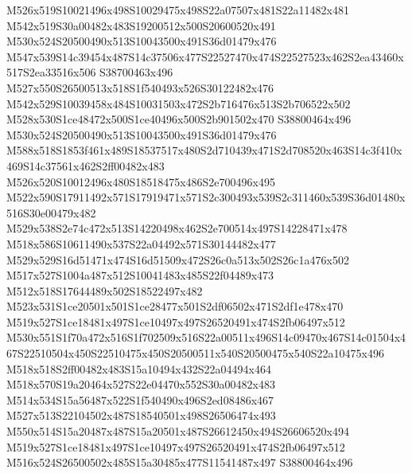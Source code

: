 \documentclass{article}
\begin{document}
\begin{multicols}{2}







M526x519S10021496x498S10029475x498S22a07507x481S22a11482x481 M542x519S30a00482x483S19200512x500S20600520x491 M530x524S20500490x513S10043500x491S36d01479x476 M547x539S14c39454x487S14c37506x477S22527470x474S22527523x462S2ea43460x517S2ea33516x506 S38700463x496 M527x550S26500513x518S1f540493x526S30122482x476 M542x529S10039458x484S10031503x472S2b716476x513S2b706522x502 M528x530S1ce48472x500S1ce40496x500S2b901502x470 S38800464x496 M530x524S20500490x513S10043500x491S36d01479x476 M588x518S1853f461x489S18537517x480S2d710439x471S2d708520x463S14c3f410x469S14c37561x462S2ff00482x483 M526x520S10012496x480S18518475x486S2e700496x495 M522x590S17911492x571S17919471x571S2c300493x539S2c311460x539S36d01480x516S30e00479x482 M529x538S2e74c472x513S14220498x462S2e700514x497S14228471x478 M518x586S10611490x537S22a04492x571S30144482x477 M529x529S16d51471x474S16d51509x472S26c0a513x502S26c1a476x502 M517x527S1004a487x512S10041483x485S22f04489x473 M512x518S17644489x502S18522497x482 M523x531S1ce20501x501S1ce28477x501S2df06502x471S2df1e478x470 M519x527S1ce18481x497S1ce10497x497S26520491x474S2fb06497x512 M530x551S1f70a472x516S1f702509x516S22a00511x496S14c09470x467S14c01504x467S22510504x450S22510475x450S20500511x540S20500475x540S22a10475x496 M518x518S2ff00482x483S15a10494x432S22a04494x464 M518x570S19a20464x527S22e04470x552S30a00482x483 M514x534S15a56487x522S1f540490x496S2ed08486x467 M527x513S22104502x487S18540501x498S26506474x493 M550x514S15a20487x487S15a20501x487S26612450x494S26606520x494 M519x527S1ce18481x497S1ce10497x497S26520491x474S2fb06497x512 M516x524S26500502x485S15a30485x477S11541487x497 S38800464x496


\end{multicols}
\end{document}
